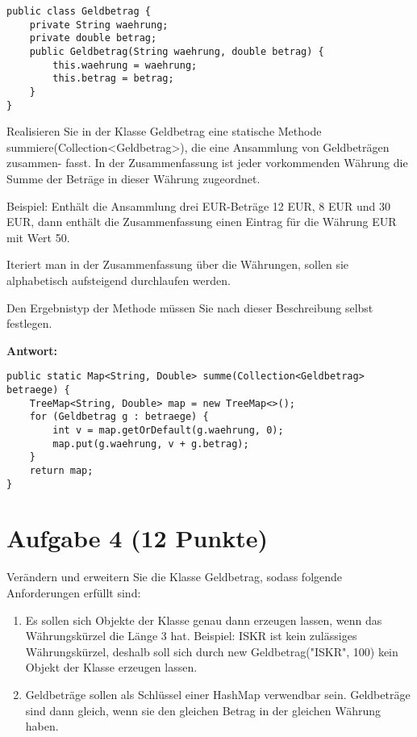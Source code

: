 \begin{lstlisting}
public class Geldbetrag {
    private String waehrung;
    private double betrag;
    public Geldbetrag(String waehrung, double betrag) {
        this.waehrung = waehrung;
        this.betrag = betrag;
    }
}
\end{lstlisting}

Realisieren Sie in der Klasse Geldbetrag eine statische Methode
summiere(Collection<Geldbetrag>), die eine Ansammlung von Geldbeträgen
zusammen- fasst. In der Zusammenfassung ist jeder vorkommenden Währung die
Summe der Beträge in dieser Währung zugeordnet.

Beispiel: Enthält die Ansammlung drei EUR-Beträge 12 EUR, 8 EUR und 30 EUR,
dann enthält die Zusammenfassung einen Eintrag für die Währung EUR mit Wert 50.

Iteriert man in der Zusammenfassung über die Währungen, sollen sie alphabetisch
aufsteigend durchlaufen werden.

Den Ergebnistyp der Methode müssen Sie nach dieser Beschreibung selbst
festlegen.

\textbf{Antwort:}

\begin{lstlisting}
public static Map<String, Double> summe(Collection<Geldbetrag> betraege) {
    TreeMap<String, Double> map = new TreeMap<>();
    for (Geldbetrag g : betraege) {
        int v = map.getOrDefault(g.waehrung, 0);
        map.put(g.waehrung, v + g.betrag);
    }
    return map;
}
\end{lstlisting}

\section{Aufgabe 4 (12 Punkte)}

Verändern und erweitern Sie die Klasse Geldbetrag, sodass folgende
Anforderungen erfüllt sind:

\begin{enumerate}
    \item Es sollen sich Objekte der Klasse genau dann erzeugen lassen, wenn das
          Währungskürzel die Länge 3 hat. \newline Beispiel: ISKR ist kein zulässiges
          Währungskürzel, deshalb soll sich durch new Geldbetrag("ISKR", 100) kein Objekt
          der Klasse erzeugen lassen.
    \item Geldbeträge sollen als Schlüssel einer HashMap verwendbar sein. Geldbeträge
          sind dann gleich, wenn sie den gleichen Betrag in der gleichen Währung haben.
\end{enumerate}

